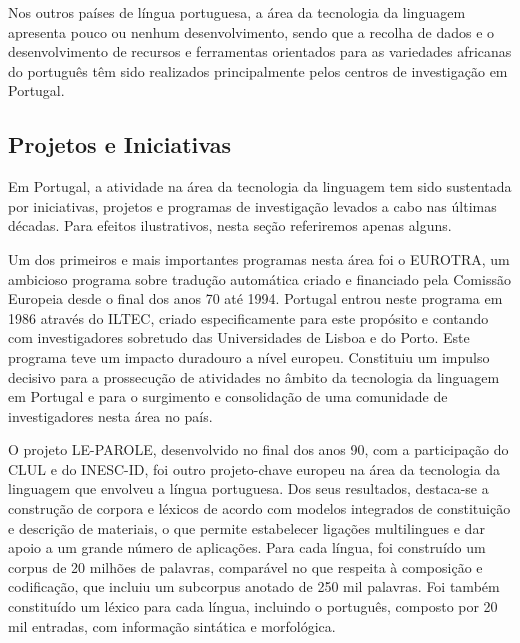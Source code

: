 \begin{multicols}{2}
Nos outros países de língua portuguesa, a área da tecnologia da linguagem apresenta pouco ou nenhum desenvolvimento, 
sendo que a recolha de dados e o desenvolvimento de recursos e ferramentas orientados para as variedades africanas do português 
têm sido realizados principalmente pelos centros de investigação em Portugal.

\subsection{Projetos e Iniciativas}

Em Portugal, a atividade na área da tecnologia da linguagem tem sido sustentada
por iniciativas, projetos e programas de investigação levados a cabo nas últimas décadas. 
Para efeitos ilustrativos, nesta seção referiremos apenas alguns.

Um dos primeiros e mais importantes programas nesta área foi o EUROTRA, 
um ambicioso programa sobre tradução automática criado e financiado pela Comissão Europeia desde o final dos anos 70 até 1994. 
Portugal entrou neste programa em 1986 através do ILTEC, criado especificamente para este propósito
e contando com investigadores sobretudo das Universidades de Lisboa e do Porto. 
Este programa teve um impacto duradouro a nível europeu. 
Constituiu um impulso decisivo para a prossecução de atividades no âmbito da tecnologia da linguagem em Portugal 
e para o surgimento e consolidação de uma comunidade de investigadores nesta área no país.

O projeto LE-PAROLE, desenvolvido no final dos anos 90, com a participação do CLUL e do INESC-ID, 
foi outro projeto-chave europeu na área da tecnologia da linguagem que envolveu a língua portuguesa. 
Dos seus resultados, destaca-se a construção de corpora e léxicos de acordo com modelos integrados 
de constituição e descrição de materiais, o que permite estabelecer ligações multilingues 
e dar apoio a um grande número de aplicações. 
Para cada língua, foi construído um corpus de 20 milhões de palavras, comparável no que res\-pei\-ta à composição e codificação, 
que incluiu um subcorpus anotado de 250 mil palavras. 
Foi também constituído um léxico para cada língua, incluindo o português, composto por 20 mil entradas, 
com informação sintática e morfológica.


\end{multicols}
